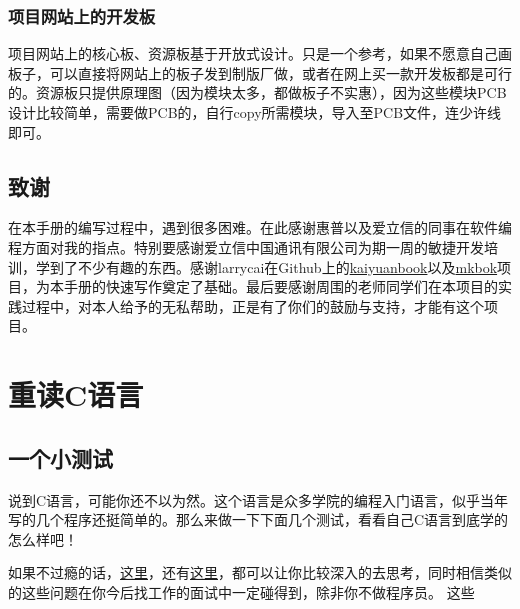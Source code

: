 \documentclass[a4paper]{book}
\makeatletter
\let\savedtitle=\@title
\renewcommand{\headrulewidth}{0pt}
\newcounter{tab}[chapter]
\newcommand{\chap}[1]{\newpage\thispagestyle{empty}\chapter{#1}\label{chap:\thechapter}}
\makeatother
\begin{document}
\subsection*{项目网站上的开发板}

项目网站上的核心板、资源板基于开放式设计。只是一个参考，如果不愿意自己画板子，可以直接将网站上的板子发到制版厂做，或者在网上买一款开发板都是可行的。资源板只提供原理图（因为模块太多，都做板子不实惠），因为这些模块PCB设计比较简单，需要做PCB的，自行copy所需模块，导入至PCB文件，连少许线即可。

\section*{致谢}

在本手册的编写过程中，遇到很多困难。在此感谢惠普以及爱立信的同事在软件编程方面对我的指点。特别要感谢爱立信中国通讯有限公司为期一周的敏捷开发培训，学到了不少有趣的东西。感谢larrycai在Github上的\href{www.github.com/larrycai/kaiyuanbook}{kaiyuanbook}以及\href{www.github.com/larrycai/mkbok}{mkbok}项目，为本手册的快速写作奠定了基础。最后要感谢周围的老师同学们在本项目的实践过程中，对本人给予的无私帮助，正是有了你们的鼓励与支持，才能有这个项目。

\tableofcontents\newpage\thispagestyle{empty}


\fancyhf{}
\fancyhead[LE]{\color{colorheader}\quad\small\textbf\thepage\quad\quad\small\leftmark}
\fancyhead[RO]{\color{colorheader}\small\rightmark\quad\quad\small\textbf\thepage\quad}

\pagestyle{fancy}

\mainmatter
\chap{重读C语言}

\section{一个小测试}

说到C语言，可能你还不以为然。这个语言是众多学院的编程入门语言，似乎当年写的几个程序还挺简单的。那么来做一下下面几个测试，看看自己C语言到底学的怎么样吧！

如果不过瘾的话，\href{http://coolshell.cn/articles/945.html}{这里}，还有\href{http://coolshell.cn/articles/873.html}{这里}，都可以让你比较深入的去思考，同时相信类似的这些问题在你今后找工作的面试中一定碰得到，除非你不做程序员。 这些
\end{document}
